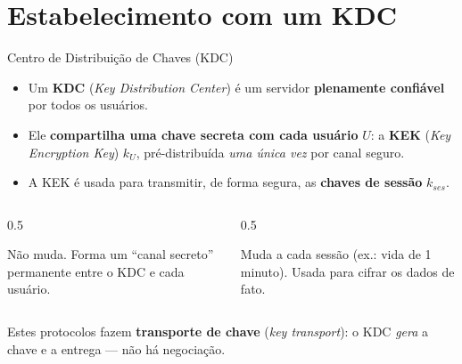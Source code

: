 \documentclass{beamer}
\begin{document}
\section{Estabelecimento com um KDC}

\begin{frame}{Centro de Distribuição de Chaves (KDC)}
    \begin{itemize}
        \item Um \textbf{KDC} (\textit{Key Distribution Center}) é um servidor \textbf{plenamente confiável} por todos os usuários.
        \item Ele \textbf{compartilha uma chave secreta com cada usuário} $U$: a \textbf{KEK} (\textit{Key Encryption Key}) $k_U$, pré-distribuída \emph{uma única vez} por canal seguro.
        \item A KEK é usada para transmitir, de forma segura, as \textbf{chaves de sessão} $k_{ses}$.
    \end{itemize}
    \medskip
    \begin{columns}[T]
        \begin{column}{0.5\textwidth}
            \begin{tcolorbox}[colback=green!6,colframe=green!50!black,boxrule=0.5pt,title=\footnotesize KEK $k_U$ (longo prazo)]
                \footnotesize
                Não muda. Forma um ``canal secreto'' permanente entre o KDC e cada usuário.
            \end{tcolorbox}
        \end{column}
        \begin{column}{0.5\textwidth}
            \begin{tcolorbox}[colback=blue!6,colframe=blue!50!black,boxrule=0.5pt,title=\footnotesize Chave de sessão $k_{ses}$ (efêmera)]
                \footnotesize
                Muda a cada sessão (ex.: vida de 1 minuto). Usada para cifrar os dados de fato.
            \end{tcolorbox}
        \end{column}
    \end{columns}
    \medskip
    {\footnotesize Estes protocolos fazem \textbf{transporte de chave} (\textit{key transport}): o KDC \emph{gera} a chave e a entrega --- não há negociação.}
\end{frame}
\end{document}
